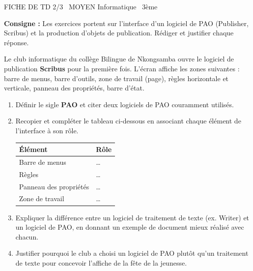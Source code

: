 \documentclass[11pt]{article}
\begin{document}
\begin{tcolorbox}[enhanced,colback=popink,colframe=popink,arc=10pt,boxrule=0pt,left=12pt,right=12pt,top=9pt,bottom=9pt]
{\color{white}\popxbold\small FICHE DE TD 2/3 \textbullet\ MOYEN \hfill Informatique \textbullet\ 3ème\par}
\end{tcolorbox}
\vspace{4pt}
\textbf{Consigne :} Les exercices portent sur l'interface d'un logiciel de PAO (Publisher, Scribus) et la production d'objets de publication. Rédiger et justifier chaque réponse.

\begin{exercice}
Le club informatique du collège Bilingue de Nkongsamba ouvre le logiciel de publication \textbf{Scribus} pour la première fois. L'écran affiche les zones suivantes : barre de menus, barre d'outils, zone de travail (page), règles horizontale et verticale, panneau des propriétés, barre d'état.
\begin{enumerate}
  \item Définir le sigle \textbf{PAO} et citer deux logiciels de PAO couramment utilisés.
  \item Recopier et compléter le tableau ci-dessous en associant chaque élément de l'interface à son rôle.
  \begin{center}
  \begin{tabular}{|l|l|}
  \hline
  \textbf{Élément} & \textbf{Rôle} \\
  \hline
  Barre de menus & \ldots \\
  \hline
  Règles & \ldots \\
  \hline
  Panneau des propriétés & \ldots \\
  \hline
  Zone de travail & \ldots \\
  \hline
  \end{tabular}
  \end{center}
  \item Expliquer la différence entre un logiciel de traitement de texte (ex. Writer) et un logiciel de PAO, en donnant un exemple de document mieux réalisé avec chacun.
  \item Justifier pourquoi le club a choisi un logiciel de PAO plutôt qu'un traitement de texte pour concevoir l'affiche de la fête de la jeunesse.
\end{enumerate}
\end{exercice}
\end{document}
